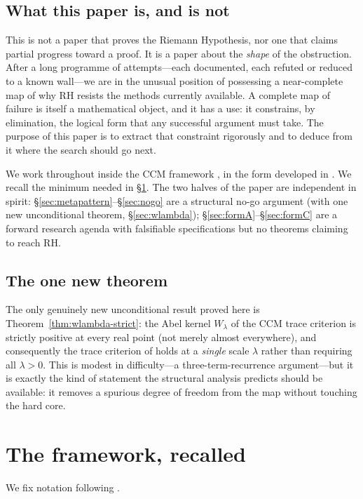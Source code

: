 \documentclass[11pt]{amsart}
\theoremstyle{definition}
\theoremstyle{remark}
\newcommand{\Wl}{W_\lambda}
\begin{document}
\subsection{What this paper is, and is not}
This is not a paper that proves the Riemann Hypothesis, nor one that
claims partial progress toward a proof. It is a paper about the
\emph{shape} of the obstruction. After a long programme of attempts---each
documented, each refuted or reduced to a known wall---we are in the
unusual position of possessing a near-complete map of why RH resists the
methods currently available. A complete map of failure is itself a
mathematical object, and it has a use: it constrains, by elimination, the
logical form that any successful argument must take. The purpose of this
paper is to extract that constraint rigorously and to deduce from it where
the search should go next.

We work throughout inside the CCM framework \cite{CCM24}, in the form
developed in \cite{P39,P40}. We recall the minimum needed in
\S\ref{sec:framework}. The two halves of the paper are independent in
spirit: \S\ref{sec:metapattern}--\S\ref{sec:nogo} are a structural no-go
argument (with one new unconditional theorem, \S\ref{sec:wlambda});
\S\ref{sec:formA}--\S\ref{sec:formC} are a forward research agenda with
falsifiable specifications but no theorems claiming to reach RH.

\subsection{The one new theorem}
The only genuinely new unconditional result proved here is
Theorem~\ref{thm:wlambda-strict}: the Abel kernel $\Wl$ of the CCM trace
criterion is strictly positive at every real point (not merely almost
everywhere), and consequently the trace criterion of \cite{P39} holds at a
\emph{single} scale $\lambda$ rather than requiring all $\lambda>0$. This
is modest in difficulty---a three-term-recurrence argument---but it is
exactly the kind of statement the structural analysis predicts should be
available: it removes a spurious degree of freedom from the map without
touching the hard core.

\section{The framework, recalled}\label{sec:framework}

We fix notation following \cite{P39,P40}.
\end{document}
